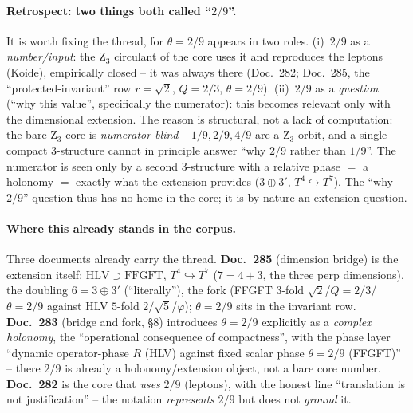 \paragraph{Retrospect: two things both called \enquote{$2/9$}.} It is worth fixing the thread, for
$\theta=2/9$ appears in two roles. (i)~$2/9$ as a \emph{number/input}: the Z$_3$ circulant of the core
uses it and reproduces the leptons (Koide), empirically closed -- it was always there (Doc.~282;
Doc.~285, the \enquote{protected-invariant} row $r=\sqrt2$, $Q=2/3$, $\theta=2/9$). (ii)~$2/9$ as a
\emph{question} (\enquote{why this value}, specifically the numerator): this becomes relevant only with
the dimensional extension. The reason is structural, not a lack of computation: the bare Z$_3$ core is
\emph{numerator-blind} -- $1/9,2/9,4/9$ are a Z$_3$ orbit, and a single compact $3$-structure cannot in
principle answer \enquote{why $2/9$ rather than $1/9$}. The numerator is seen only by a second
$3$-structure with a relative phase $=$ a holonomy $=$ exactly what the extension provides ($3\oplus3'$,
$T^4\!\hookrightarrow\!T^7$). The \enquote{why-$2/9$} question thus has no home in the core; it is by
nature an extension question.

\paragraph{Where this already stands in the corpus.} Three documents already carry the thread.
\textbf{Doc.~285} (dimension bridge) is the extension itself: $\mathrm{HLV}\supset\mathrm{FFGFT}$,
$T^4\hookrightarrow T^7$ ($7=4+3$, the three perp dimensions), the doubling $6=3\oplus3'$
(\enquote{literally}), the fork (FFGFT $3$-fold $\sqrt2$/$Q=2/3$/$\theta=2/9$ against HLV $5$-fold
$2/\sqrt5$/$\varphi$); $\theta=2/9$ sits in the invariant row. \textbf{Doc.~283} (bridge and fork, §8)
introduces $\theta=2/9$ explicitly as a \emph{complex holonomy}, the \enquote{operational consequence of
compactness}, with the phase layer \enquote{dynamic operator-phase $R$ (HLV) against fixed scalar phase
$\theta=2/9$ (FFGFT)} -- there $2/9$ is already a holonomy/extension object, not a bare core number.
\textbf{Doc.~282} is the core that \emph{uses} $2/9$ (leptons), with the honest line \enquote{translation
is not justification} -- the notation \emph{represents} $2/9$ but does not \emph{ground} it.

